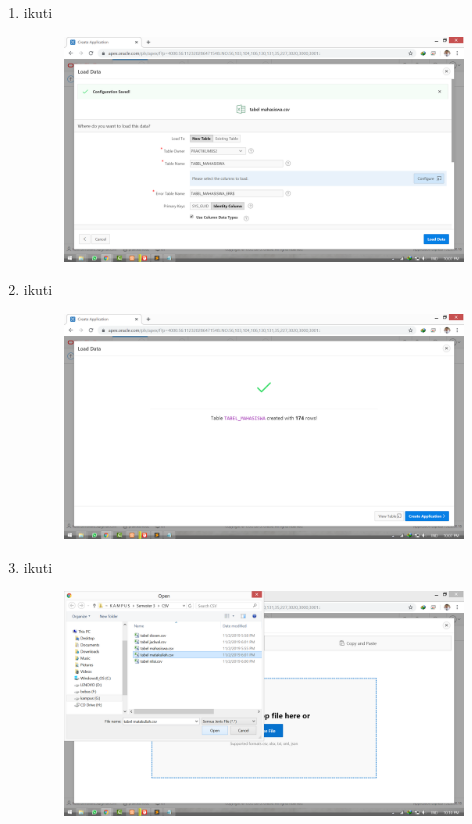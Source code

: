 \documentclass[11pt]{article}
\begin{document}
\begin{enumerate}
\item ikuti
\begin{figure}
        \centerline{\includegraphics[scale=0.1]{img/17loaddatatetabel.png}}
        \caption{}
		\label{langkah18}
\end{figure}

\item ikuti
\begin{figure}
        \centerline{\includegraphics[scale=0.1]{img/18createtabel.png}}
        \caption{}
		\label{langkah19}
\end{figure}

\item ikuti
\begin{figure}
        \centerline{\includegraphics[scale=0.1]{img/19dragtabel.png}}
        \caption{}
		\label{langkah20}
\end{figure}


\end{enumerate}
\end{document}
